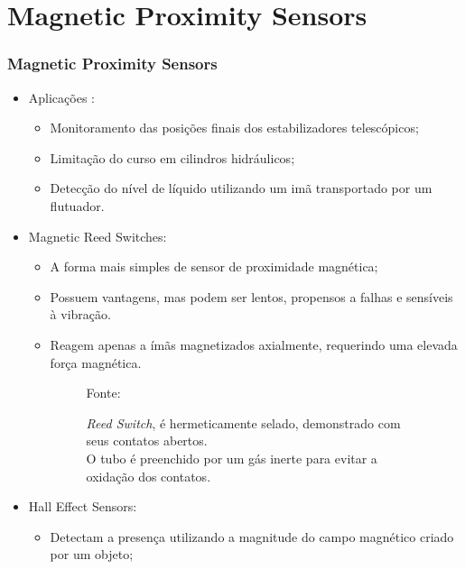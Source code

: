 \documentclass[xcolor=dvipsnames, aspectratio=169]{beamer}
\begin{document}
\section[Magnetic Proximity Sensors]{Magnetic Proximity Sensors} 
\begin{frame}
\frametitle{Magnetic Proximity Sensors}
	\begin{itemize}
		\item Aplicações \cite{baumermagnetic}:
		\begin{itemize}
			\item Monitoramento das posições finais dos estabilizadores telescópicos;
			\item Limitação do curso em cilindros hidráulicos;
			\item Detecção do nível de líquido utilizando um imã transportado por um flutuador.
		\end{itemize}
		\item Magnetic Reed Switches:
		\begin{itemize}
			\item A forma mais simples de sensor de proximidade magnética;
			\item Possuem vantagens, mas podem ser lentos, propensos a falhas e sensíveis à vibração. 
			\item Reagem apenas a ímãs magnetizados axialmente, requerindo uma elevada força magnética.
			\begin{figure}
                \centering
                {Fonte: \cite{everett1995sensors}}
                \caption{\textit{Reed Switch}, é hermeticamente selado, demonstrado com seus contatos abertos.\\ O tubo é preenchido por um gás inerte para evitar a oxidação dos contatos.}
                \label{fig:1_reed_switch}
            \end{figure}
		\newpage
		\end{itemize}
		\item Hall Effect Sensors:
		\begin{itemize}
			\item Detectam a presença utilizando a magnitude do campo magnético criado por um objeto;

\end{itemize}
\end{itemize}
\end{frame}
\end{document}
